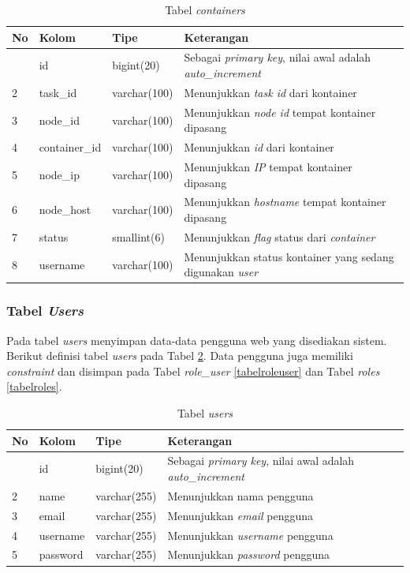 				\begin{longtable}{|p{}|p{}|p{}|p{}|}
					\caption{Tabel \textit{containers}} \label{tabelcontainers} \\
					\hline
					\textbf{No} & \textbf{Kolom} & \textbf{Tipe} & \textbf{Keterangan} \\ \hline
					\endhead
					\endfoot
					\endlastfoot
					1 & id & bigint(20) & Sebagai \textit{primary key}, nilai awal adalah \textit{auto\_increment} \\ \hline
					2 & task\_id & varchar(100) & Menunjukkan \textit{task id} dari kontainer \\ \hline
					3 & node\_id & varchar(100) & Menunjukkan \textit{node id} tempat kontainer dipasang \\ \hline
					4 & container\_id & varchar(100) & Menunjukkan \textit{id} dari kontainer \\ \hline
					5 & node\_ip & varchar(100) & Menunjukkan \textit{IP} tempat kontainer dipasang \\ \hline
					6 & node\_host & varchar(100) & Menunjukkan \textit{hostname} tempat kontainer dipasang \\ \hline
					7 & status & smallint(6) & Menunjukkan \textit{flag} status dari \textit{container} \\ \hline
					8 & username & varchar(100) & Menunjukkan status kontainer yang sedang digunakan \textit{user} \\ \hline
				\end{longtable}
		
			\subsubsection{Tabel \textit{Users}}
				Pada tabel \textit{users} menyimpan data-data pengguna web yang disediakan sistem. Berikut definisi tabel \textit{users} pada Tabel \ref{tabelusers}. Data pengguna juga memiliki \textit{constraint} dan disimpan pada Tabel \textit{role\_user} \ref{tabelroleuser} dan Tabel \textit{roles} \ref{tabelroles}.
				
				\begin{longtable}{|p{}|p{}|p{}|p{}|}
					\caption{Tabel \textit{users}} \label{tabelusers} \\
					\hline
					\textbf{No} & \textbf{Kolom} & \textbf{Tipe} & \textbf{Keterangan} \\ \hline
					\endhead
					\endfoot
					\endlastfoot
					1 & id & bigint(20) & Sebagai \textit{primary key}, nilai awal adalah \textit{auto\_increment} \\ \hline
					2 & name & varchar(255) & Menunjukkan nama pengguna \\ \hline
					3 & email & varchar(255) & Menunjukkan \textit{email} pengguna \\ \hline
					4 & username & varchar(255) & Menunjukkan \textit{username} pengguna \\ \hline
					5 & password & varchar(255) & Menunjukkan \textit{password} pengguna \\ \hline
				\end{longtable}
			

